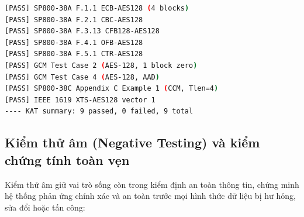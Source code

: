 \documentclass[12pt, a4paper]{report}
\begin{document}
\begin{lstlisting}[language=bash, caption={Nhật ký thực thi KAT Runner}]
[PASS] SP800-38A F.1.1 ECB-AES128 (4 blocks)
[PASS] SP800-38A F.2.1 CBC-AES128
[PASS] SP800-38A F.3.13 CFB128-AES128
[PASS] SP800-38A F.4.1 OFB-AES128
[PASS] SP800-38A F.5.1 CTR-AES128
[PASS] GCM Test Case 2 (AES-128, 1 block zero)
[PASS] GCM Test Case 4 (AES-128, AAD)
[PASS] SP800-38C Appendix C Example 1 (CCM, Tlen=4)
[PASS] IEEE 1619 XTS-AES128 vector 1
---- KAT summary: 9 passed, 0 failed, 9 total
\end{lstlisting}

\subsection{Kiểm thử âm (Negative Testing) và kiểm chứng tính toàn vẹn}
Kiểm thử âm giữ vai trò sống còn trong kiểm định an toàn thông tin, chứng minh hệ thống phản ứng chính xác và an toàn trước mọi hình thức dữ liệu bị hư hỏng, sửa đổi hoặc tấn công:
\end{document}

